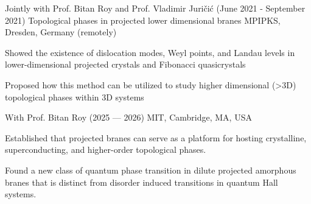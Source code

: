 \begin{cventries}


\cventry
{Jointly with Prof. Bitan Roy and Prof. Vladimir Juri\v{c}i\'c (June 2021 - September 2021)} %
{Topological phases in projected lower dimensional branes} %
{MPIPKS, Dresden, Germany (remotely)} %
{} %
{
	\begin{cvitems} %
		\item {Showed the existence of dislocation modes, Weyl points, and Landau levels in lower-dimensional projected crystals and Fibonacci quasicrystals}
		\item {Proposed how this method can be utilized to study higher dimensional (>3D) topological phases within 3D systems}
	\end{cvitems}
}
\cventry
{With Prof. Bitan Roy (2025 --- 2026)} %
{} %
{MIT, Cambridge, MA, USA} %
{} %
{
	\begin{cvitems} %
		\item {Established that projected branes can serve as a platform for hosting crystalline, superconducting, and higher-order topological phases.}
		\item {Found a new class of quantum phase transition in dilute projected amorphous branes that is distinct from disorder induced transitions in quantum Hall systems.}
	\end{cvitems}
}


\end{cventries}
